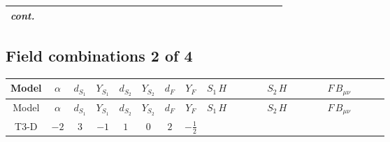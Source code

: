\documentclass[8pt]{article}
\begin{document}
\begin{landscape}
\begin{longtable}{@{}cccccccc >{\raggedright\arraybackslash}p{0.21\linewidth} >{\raggedright\arraybackslash}p{0.21\linewidth} >{\raggedright\arraybackslash}p{0.21\linewidth}@{}}
\textit{cont.} &  &  &  &  &  &  &  & \scriptsize\adjustbox{max width=\linewidth}{$\begin{gathered} -\frac{2 \hbar  \log \left(\frac{\bar{\mu}^{2}}{m_2^2}\right) \overline{\lambda_5} H_{a_1} H_{a_2} m_2^2 \lambda_5 H_{a_1}{}^{\dagger } H_{a_2}{}^{\dagger }}{\sqrt{3} \left(m_1^2-m_2^2\right)} \\ +\text{CH21} \hbar  H_{a_2} H_{a_1}{}^{\dagger } \mathcal{I}_{H2,a_1,a_2}{}^1\end{gathered}$} &  &  \\
\midrule
\bottomrule
\end{longtable}
\clearpage
\subsection*{Field combinations 2 of 4}
\begin{longtable}{@{}cccccccc >{\raggedright\arraybackslash}p{0.21\linewidth} >{\raggedright\arraybackslash}p{0.21\linewidth} >{\raggedright\arraybackslash}p{0.21\linewidth}@{}}
\toprule
Model & $\alpha$ & $d_{S_1}$ & $Y_{S_1}$ & $d_{S_2}$ & $Y_{S_2}$ & $d_F$ & $Y_F$ & $S_1\,H$ & $S_2\,H$ & $F\,B_{\mu\nu}$ \\
\midrule
\endfirsthead
\toprule
Model & $\alpha$ & $d_{S_1}$ & $Y_{S_1}$ & $d_{S_2}$ & $Y_{S_2}$ & $d_F$ & $Y_F$ & $S_1\,H$ & $S_2\,H$ & $F\,B_{\mu\nu}$ \\
\midrule
\endhead
T3-D & $-2$ & $3$ & $-1$ & $1$ & $0$ & $2$ & $-\frac{1}{2}$ & \scriptsize\adjustbox{max width=\linewidth}{$\begin{gathered} +\frac{3 \hbar  H_{a_1} H_{a_2} H_{a_1}{}^{\dagger } H_{a_2}{}^{\dagger } \left(\lambda_{HS_1}^{(1)}^{(2)}\right){}^2}{2 \epsilon } \\ +\frac{3}{2} \hbar  \log \left(\frac{\bar{\mu}^{2}}{m_1^2}\right) H_{a_1} H_{a_2} H_{a_1}{}^{\dagger } H_{a_2}{}^{\dagger } \left(\lambda_{HS_1}^{(1)}^{(2)}\right){}^2\end{gathered}$} & \scriptsize\adjustbox{max width=\linewidth}{$\begin{gathered} +\frac{\hbar  H_{a_3} H_{a_4} H_{a_1}{}^{\dagger } H_{a_2}{}^{\dagger } \mathcal{I}_{H2,a_1,a_3}{}^1 \mathcal{I}_{H2,a_2,a_4}{}^1 \left(\lambda_{HS_2}^{(1)}^{(1)}\right){}^2}{2 \epsilon } \\ +\frac{1}{2} \hbar  \log \left(\frac{\bar{\mu}^{2}}{m_2^2}\right) H_{a_3} H_{a_4} H_{a_1}{}^{\dagger } H_{a_2}{}^{\dagger } \mathcal{I}_{H2,a_1,a_3}{}^1 \mathcal{I}_{H2,a_2,a_4}{}^1 \left(\lambda_{HS_2}^{(1)}^{(1)}\right){}^2\end{gathered}$} & \scriptsize\adjustbox{max width=\linewidth}{$\begin{gathered} -\frac{1}{2} \hbar  \log \left(\frac{\bar{\mu}^{2}}{M_F^2}\right) B_{\mu _1\mu _2}^2\end{gathered}$} \\
\midrule
\bottomrule
\end{longtable}
\clearpage

\end{landscape}
\end{document}
